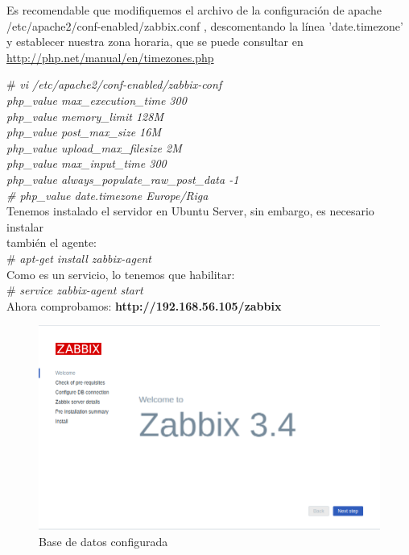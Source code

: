  


Es recomendable que modifiquemos el archivo  de la configuración de apache /etc/apache2/conf-enabled/zabbix.conf , descomentando la línea 'date.timezone' y establecer nuestra zona horaria, que se puede consultar en \url{http://php.net/manual/en/timezones.php} 

\# \textit{vi /etc/apache2/conf-enabled/zabbix-conf \\
	php\_value max\_execution\_time 300 \\
	php\_value memory\_limit 128M \\
	php\_value post\_max\_size 16M \\
	php\_value upload\_max\_filesize 2M \\
	php\_value max\_input\_time 300 \\
	php\_value always\_populate\_raw\_post\_data -1 \\
	\# php\_value date.timezone Europe/Riga} \\



 

Tenemos instalado el servidor en Ubuntu Server, sin embargo, es necesario instalar \\ también el agente: \\
\# \textit{apt-get install zabbix-agent} \\

Como es un servicio, lo tenemos que habilitar: \\
\# \textit{service zabbix-agent start} \\ 


Ahora comprobamos:
\textbf{http://192.168.56.105/zabbix}

\newpage
 \begin{figure}[h]
 	\centering
 	\includegraphics[scale=0.5]{images/zabbix.png}
 	\caption{Base de datos configurada}
 \end{figure}
 

